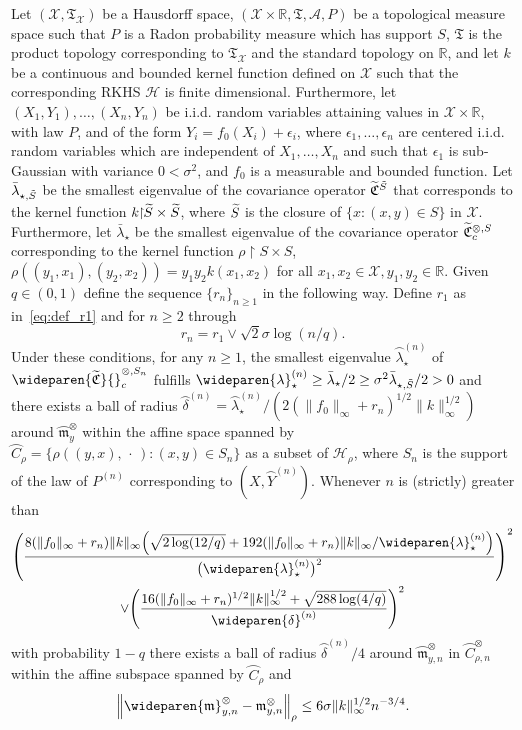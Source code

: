 \documentclass[AHL,Unicode,longabstracts,published]{cedram}
\theoremstyle{remark}
\newcommand{\restrr}
{\!\!\upharpoonright\!\!}
\newcommand{\R}{\mathbb{R}}
\newcommand{\X}{\mathcal{X}}
\newcommand{\clA}{\mathcal{A}}
\newcommand{\cH}{\mathcal{H}}
\newcommand{\fkC}{\mathfrak{C}}
\newcommand{\fkT}{\mathfrak{T}}
\newcommand{\Cov}{\tilde{\fkC}}
\newcommand{\mean}{\mathfrak{m}}
\newcommand{\CovCapn}{\wideparen{\widetilde{\fkC}}{\vphantom{\fkC}}^{\otimes,S_n}_c}
\let\oldtilde\tilde
\renewcommand*{\tilde}[1]{\mathchoice{\widetilde{#1}}{\widetilde{#1}}{\oldtilde{#1}}{\oldtilde{#1}}}
\let\originalleft\left
\let\originalright\right
\renewcommand{\left}{\mathopen{}\mathclose\bgroup\originalleft}
\renewcommand{\right}{\aftergroup\egroup\originalright}
\begin{document}
\begin{prop}\label{prop:unbounded}
Let $(\X, \fkT_\X)$ be a Hausdorff space, $(\X \times \R,\fkT, \clA,P)$ be a topological measure space such that $P$ is a Radon probability measure which has support $S$, $\fkT$ is the product topology corresponding to $\fkT_\X$ and the standard topology on $\R$, and let $k$ be a continuous and bounded kernel function defined on $\X$ such that the corresponding RKHS $\cH$ is finite dimensional. Furthermore, let $(X_1,Y_1),\dots, (X_n,Y_n)$ be i.i.d. random variables attaining values in $\X \times \R$, with law $P$, and of the form $Y_i = f_0(X_i) + \epsilon_i$, where $\epsilon_1,\dots, \epsilon_n$ are centered i.i.d. random variables which are independent of $X_1,\dots, X_n$ and such that $\epsilon_1$ is sub-Gaussian with variance $0 < \sigma^2$, and $f_0$ is a measurable and bounded function. Let $\bar \lambda_{\star,\tilde S}$ be the smallest eigenvalue of the covariance operator $\Cov^{\tilde S}$ that corresponds to the kernel function $k\restrr \tilde S \times \tilde S$, where $\tilde S$ is the closure of $\{x : (x,y) \in S\}$ in $\X$. Furthermore, let $\bar \lambda_\star$ be the smallest eigenvalue of the covariance operator $\Cov^{\otimes,S}_c$ corresponding to the kernel function $\rho \restrr S \times S$, $\rho((y_1,x_1),(y_2,x_2)) = y_1 y_2 k(x_1,x_2)$ for all $x_1,x_2 \in \X, y_1,y_2 \in \R$.\pagebreak{} Given $q \in (0,1)$ define the sequence $\{r_n\}_{n\geq 1}$ in the following way. Define $r_1$ as in~\eqref{eq:def_r1} and for $n \geq 2$ through
\[
r_n = r_1 \vee \sqrt{2} \sigma \log(n/q).
\]
Under these conditions, for any $n\geq 1$, the smallest eigenvalue $\wideparen{\lambda}_\star^{(n)}$ of $\CovCapn$ fulfills $\wideparen{\lambda}_\star^{(n)} \geq \bar \lambda_\star/2 \geq \sigma^2 \bar \lambda_{\star,\tilde S}/2 > 0$ and there exists a ball of radius $\wideparen{\delta}^{(n)} = \wideparen{\lambda}_\star^{(n)} / (2 (\|f_0\|_\infty + r_n)^{1/2} \|k\|^{1/2}_\infty)$ around $\wideparen{\mean}^\otimes_{y}$ within the affine space spanned by $\wideparen{C}_\rho = \{ \rho((y,x),\,\cdot\,) : (x,y) \in S_n\}$ as a subset of $\cH_\rho$, where $S_n$ is the support of the law of $P^{(n)}$ corresponding to $(X,\wideparen{Y}^{(n)})$. Whenever $n$ is (strictly) greater than
\begin{multline*}
\left(\frac{8 (\|f_0\|_\infty + r_n) \|k\|_\infty \left(\sqrt{2\log(12/q)} + 192 (\|f_0\|_\infty + r_n) \|k\|_\infty /\wideparen{\lambda}^{(n)}_\star\right)}{\bigl(\wideparen{\lambda}^{(n)}_\star\bigr)^2} \right)^{2} \\
\vee \left(\frac{16 (\|f_0\|_\infty + r_n)^{1/2} \|k\|_\infty^{1/2} + \sqrt{288\log(4/q)}}{\wideparen{\delta}^{(n)}}\right)^{2}
\end{multline*}
with probability $1-q$ there exists a ball of radius $\wideparen{\delta}^{(n)}/4$ around $\wideparen{\mean}^\otimes_{y,n}$ in $\wideparen{C}^{\otimes}_{\rho,n}$ within the affine subspace spanned by $\wideparen{C}_\rho$ and
\[
\left\|\wideparen{\mean}^\otimes_{y,n} - \mean_{y,n}^\otimes \right\|_\rho \leq 6 \sigma \|k\|_\infty^{1/2} n^{-3/4}.
\]
\end{prop}
\end{document}
